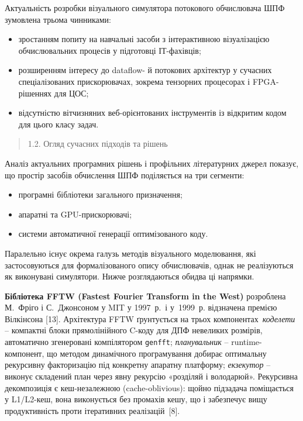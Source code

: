\documentclass[
]{article}
\begin{document}
Актуальність розробки візуального симулятора потокового обчислювача ШПФ
зумовлена трьома чинниками:

\begin{itemize}
\item
  зростанням попиту на навчальні засоби з інтерактивною візуалізацією
  обчислювальних процесів у підготовці ІТ-фахівців;
\item
  розширенням інтересу до dataflow- й потокових архітектур у сучасних
  спеціалізованих прискорювачах, зокрема тензорних процесорах і
  FPGA-рішеннях для ЦОС;
\item
  відсутністю вітчизняних веб-орієнтованих інструментів із відкритим
  кодом для цього класу задач.
\end{itemize}

\begin{quote}
\protect{}\label{ux43eux433ux43bux44fux434-ux441ux443ux447ux430ux441ux43dux438ux445-ux43fux456ux434ux445ux43eux434ux456ux432-ux442ux430-ux440ux456ux448ux435ux43dux44c}{}1.2.
Огляд сучасних підходів та рішень
\end{quote}

Аналіз актуальних програмних рішень і профільних літературних джерел
показує, що простір засобів обчислення ШПФ поділяється на три сегменти:

\begin{itemize}
\item
  програмні бібліотеки загального призначення;
\item
  апаратні та GPU-прискорювачі;
\item
  системи автоматичної генерації оптимізованого коду.
\end{itemize}

Паралельно існує окрема галузь методів візуального моделювання, які
застосовуються для формалізованого опису обчислювачів, однак не
реалізуються як виконувані симулятори. Нижче розглядаються обидва ці
напрямки.

\textbf{Бібліотека FFTW (Fastest Fourier Transform in the West)}
розроблена М.~Фріго і С.~Джонсоном у MIT у 1997~р.~і у~1999~р.
відзначена премією Вілкінсона {[}13{]}. Архітектура FFTW ґрунтується на
трьох компонентах~\emph{коделети} -- компактні блоки прямолінійного
C-коду для ДПФ невеликих розмірів, автоматично згенеровані компілятором
\texttt{genfft}; \emph{планувальник} -- runtime-компонент, що методом
динамічного програмування добирає оптимальну рекурсивну факторизацію під
конкретну апаратну платформу; \emph{екзекутор} -- виконує складений план
через явну рекурсію «розділяй і володарюй». Рекурсивна декомпозиція є
кеш-незалежною (cache-oblivious): щойно підзадача поміщається у
L1/L2-кеш, вона виконується без промахів кешу, що і забезпечує вищу
продуктивність проти ітеративних реалізацій~{[}8{]}.
\end{document}
